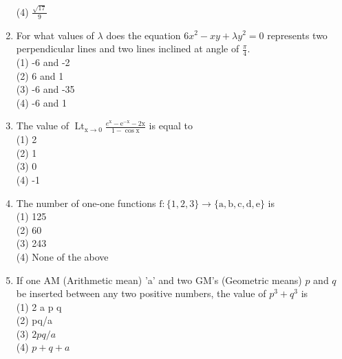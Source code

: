 \documentclass[10pt]{article}
\begin{document}
\begin{enumerate}
(4) $\frac{\sqrt{17}}{9}$
  \item For what values of $\lambda$ does the equation $6 x^{2}-x y+\lambda y^{2}=0$ represents two perpendicular lines and two lines inclined at angle of $\frac{\pi}{4}$.\\
(1) -6 and -2\\
(2) 6 and 1\\
(3) -6 and -35\\
(4) -6 and 1
  \item The value of $\operatorname{Lt}_{\mathrm{x} \rightarrow 0} \frac{e^{\mathrm{x}}-\mathrm{e}^{-\mathrm{x}}-2 \mathrm{x}}{1-\cos \mathrm{x}}$ is equal to\\
(1) 2\\
(2) 1\\
(3) 0\\
(4) -1
  \item The number of one-one functions $\mathrm{f}:\{1,2,3\} \rightarrow\{\mathrm{a}, \mathrm{b}, \mathrm{c}, \mathrm{d}, \mathrm{e}\}$ is\\
(1) 125\\
(2) 60\\
(3) 243\\
(4) None of the above
  \item If one AM (Arithmetic mean) 'a' and two GM's (Geometric means) $p$ and $q$ be inserted between any two positive numbers, the value of $p^{3}+q^{3}$ is\\
(1) 2 a p q\\
(2) pq/a\\
(3) $2 p q / a$\\
(4) $p+q+a$\\

\end{enumerate}
\end{document}
